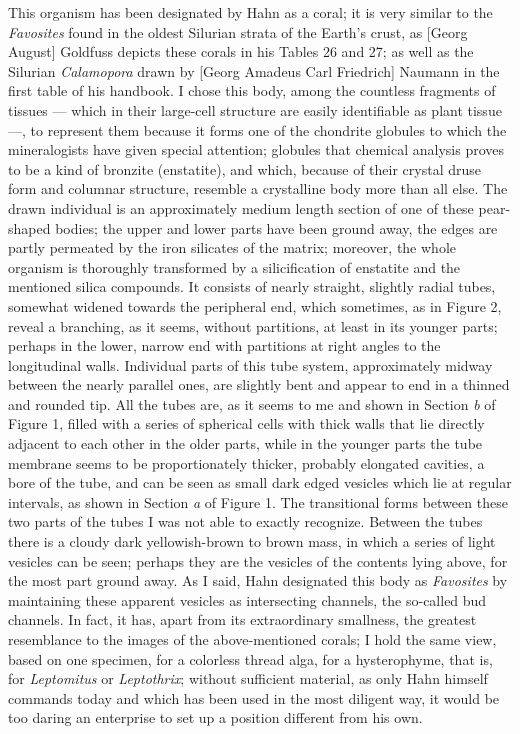 \documentclass[a4paper, 12pt, oneside]{article}
\begin{document}
This organism has been designated by Hahn as a coral; it is very similar to the \emph{Favosites} found in the oldest Silurian strata of the Earth's crust, as [Georg August] Goldfuss depicts these corals in his Tables 26 and 27; as well as the Silurian \emph{Calamopora} drawn by [Georg Amadeus Carl Friedrich] Naumann in the first table of his handbook. I chose this body, among the countless fragments of tissues --- which in their large-cell structure are easily identifiable as plant tissue ---, to represent them because it forms one of the chondrite globules to which the mineralogists have given special attention; globules that chemical analysis proves to be a kind of bronzite (enstatite), and which, because of their crystal druse form and columnar structure, resemble a crystalline body more than all else. The drawn individual is an approximately medium length section of one of these pear-shaped bodies; the upper and lower parts have been ground away, the edges are partly permeated by the iron silicates of the matrix; moreover, the whole organism is thoroughly transformed by a silicification of enstatite and the mentioned silica compounds. It consists of nearly straight, slightly radial tubes, somewhat widened towards the peripheral end, which sometimes, as in Figure 2, reveal a branching, as it seems, without partitions, at least in its younger parts; perhaps in the lower, narrow end with partitions at right angles to the longitudinal walls. Individual parts of this tube system, approximately midway between the nearly parallel ones, are slightly bent and appear to end in a thinned and rounded tip. All the tubes are, as it seems to me and shown in Section \emph{b} of Figure 1, filled with a series of spherical cells with thick walls that lie directly adjacent to each other in the older parts, while in the younger parts the tube membrane seems to be proportionately thicker, probably elongated cavities, a bore of the tube, and can be seen as small dark edged vesicles which lie at regular intervals, as shown in Section \emph{a} of Figure 1. The transitional forms between these two parts of the tubes I was not able to exactly recognize. Between the tubes there is a cloudy dark yellowish-brown to brown mass, in which a series of light vesicles can be seen; perhaps they are the vesicles of the contents lying above, for the most part ground away. As I said, Hahn designated this body as \emph{Favosites} by maintaining these apparent vesicles as intersecting channels, the so-called bud channels. In fact, it has, apart from its extraordinary smallness, the greatest resemblance to the images of the above-mentioned corals; I hold the same view, based on one specimen, for a colorless thread alga, for a hysterophyme, that is, for \emph{Leptomitus} or \emph{Leptothrix}; without sufficient material, as only Hahn himself commands today and which has been used in the most diligent way, it would be too daring an enterprise to set up a position different from his own.
\end{document}
